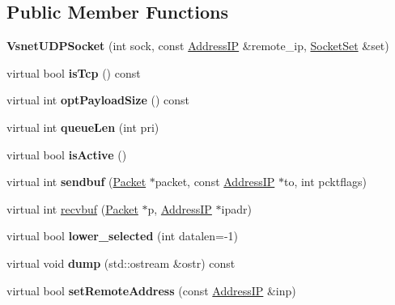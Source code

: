 \subsection*{Public Member Functions}
\begin{DoxyCompactItemize}
\item 
{\bfseries Vsnet\+U\+D\+P\+Socket} (int sock, const \hyperlink{structAddressIP}{Address\+IP} \&remote\+\_\+ip, \hyperlink{classSocketSet}{Socket\+Set} \&set)\hypertarget{classVsnetUDPSocket_aedcbc7dfc479ac23b11a17b270670fd9}{}\label{classVsnetUDPSocket_aedcbc7dfc479ac23b11a17b270670fd9}

\item 
virtual bool {\bfseries is\+Tcp} () const \hypertarget{classVsnetUDPSocket_a95f0b322feb5c8d1b656963285a0aebb}{}\label{classVsnetUDPSocket_a95f0b322feb5c8d1b656963285a0aebb}

\item 
virtual int {\bfseries opt\+Payload\+Size} () const \hypertarget{classVsnetUDPSocket_aa6c85a30ed44926b130ab10452bbf7e9}{}\label{classVsnetUDPSocket_aa6c85a30ed44926b130ab10452bbf7e9}

\item 
virtual int {\bfseries queue\+Len} (int pri)\hypertarget{classVsnetUDPSocket_a332073bb31cb321ed8205887ac9c5052}{}\label{classVsnetUDPSocket_a332073bb31cb321ed8205887ac9c5052}

\item 
virtual bool {\bfseries is\+Active} ()\hypertarget{classVsnetUDPSocket_a63581c381f6673a05fc9b123b3eb71ba}{}\label{classVsnetUDPSocket_a63581c381f6673a05fc9b123b3eb71ba}

\item 
virtual int {\bfseries sendbuf} (\hyperlink{classPacket}{Packet} $\ast$packet, const \hyperlink{structAddressIP}{Address\+IP} $\ast$to, int pcktflags)\hypertarget{classVsnetUDPSocket_ae1472a8e29191c9c837595f9c6c4117f}{}\label{classVsnetUDPSocket_ae1472a8e29191c9c837595f9c6c4117f}

\item 
virtual int \hyperlink{classVsnetUDPSocket_ad503a9d7cada896837a3fc2f3888bdec}{recvbuf} (\hyperlink{classPacket}{Packet} $\ast$p, \hyperlink{structAddressIP}{Address\+IP} $\ast$ipadr)
\item 
virtual bool {\bfseries lower\+\_\+selected} (int datalen=-\/1)\hypertarget{classVsnetUDPSocket_a5416cc9b960df097c379335761bb4b94}{}\label{classVsnetUDPSocket_a5416cc9b960df097c379335761bb4b94}

\item 
virtual void {\bfseries dump} (std\+::ostream \&ostr) const \hypertarget{classVsnetUDPSocket_a1f8667ced4925c6eabd5c7bda39556ff}{}\label{classVsnetUDPSocket_a1f8667ced4925c6eabd5c7bda39556ff}

\item 
virtual bool {\bfseries set\+Remote\+Address} (const \hyperlink{structAddressIP}{Address\+IP} \&inp)\hypertarget{classVsnetUDPSocket_a2e79635ad85d01f019a275ca874b2f88}{}\label{classVsnetUDPSocket_a2e79635ad85d01f019a275ca874b2f88}

\end{DoxyCompactItemize}
